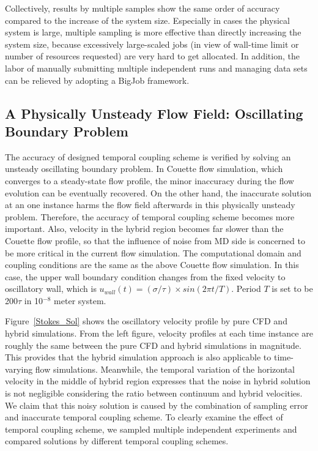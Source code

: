 \documentclass[preprint,12pt]{elsarticle}
\begin{document}
Collectively, results by multiple samples show the same order of accuracy compared to the increase of the system size. Especially in cases the physical system is large, multiple sampling is more effective than directly increasing the system size, because excessively large-scaled jobs (in view of wall-time limit or number of resources requested) are very hard to get allocated. In addition, the labor of manually submitting multiple independent runs and managing data sets can be relieved by adopting a BigJob framework.


\subsection{A Physically Unsteady Flow Field: Oscillating Boundary Problem}

The accuracy of designed temporal coupling scheme is verified by solving an unsteady oscillating boundary problem. In Couette flow simulation, which converges to a steady-state flow profile, the minor inaccuracy during the flow evolution can be eventually recovered. On the other hand, the inaccurate solution at an one instance harms the flow field afterwards in this physically unsteady problem. Therefore, the accuracy of temporal coupling scheme becomes more important. Also, velocity in the hybrid region becomes far slower than the Couette flow profile, so that the influence of noise from MD side is concerned to be more critical in the current flow simulation. The computational domain and coupling conditions are the same as the above Couette flow simulation. In this case, the upper wall boundary condition changes from the fixed velocity to oscillatory wall, which is $u_{wall}(t)=({\sigma}/{\tau}){\times}sin(2{\pi}t/T)$. Period $T$ is set to be 200$\tau$ in 10$^{-8}$ meter system. 


Figure~\ref{Stokes_Sol} shows the oscillatory velocity profile by pure CFD and hybrid simulations. From the left figure, velocity profiles at each time instance are roughly the same between the pure CFD and hybrid simulations in magnitude. This provides that the hybrid simulation approach is also applicable to time-varying flow simulations. Meanwhile, the temporal variation of the horizontal velocity in the middle of hybrid region expresses that the noise in hybrid solution is not negligible considering the ratio between continuum and hybrid velocities. We claim that this noisy solution is caused by the combination of sampling error and inaccurate temporal coupling scheme. To clearly examine the effect of temporal coupling scheme, we sampled multiple independent experiments and compared solutions by different temporal coupling schemes.
\end{document}
